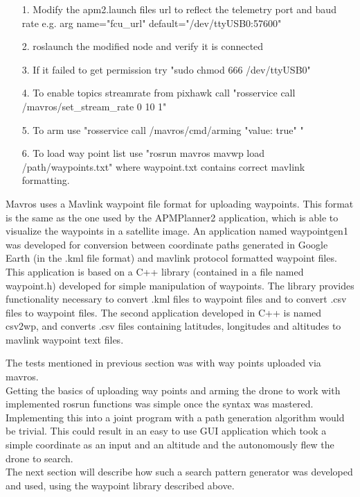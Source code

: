 \begin{itemize}

\item[1.] Modify the apm2.launch files url to reflect the telemetry port and baud rate e.g. arg
name="fcu\_url" default="/dev/ttyUSB0:57600"
\item[2.] roslaunch the modified node and verify it is connected
\item[3.] If it failed to get permission try "sudo chmod 666 /dev/ttyUSB0"
\item[4.] To enable topics streamrate from pixhawk call "rosservice call /mavros/set\_stream\_rate 0
10 1"
\item[5.] To arm use "rosservice call /mavros/cmd/arming "value: true" "
\item[6.] To load way point list use "rosrun mavros mavwp load /path/waypoints.txt" where
waypoint.txt contains correct mavlink formatting.

\end{itemize}

Mavros uses a Mavlink waypoint file format for uploading waypoints.
This format is the same as the one used by the APMPlanner2 application,
which is able to visualize the waypoints in a satellite image.
An application named waypointgen1 was developed for conversion between coordinate paths generated in
Google Earth (in the .kml file format)
and mavlink protocol formatted waypoint files. This application is based on a C++ library (contained
in a file named waypoint.h)
developed for simple manipulation of waypoints. The library provides functionality necessary to
convert .kml files to waypoint files
and to convert .csv files to waypoint files.
The second application developed in C++ is named csv2wp, and converts .csv files containing
latitudes, longitudes and altitudes to mavlink waypoint text files.

The tests mentioned in previous section was with way points uploaded via mavros.\\
Getting the basics of uploading way points and arming the drone to work with implemented rosrun
functions was simple once the syntax was mastered. Implementing this into a joint program with a
path generation algorithm would be trivial. This could result in an easy to use GUI application
which took a simple coordinate as an input and an altitude and the autonomously flew the drone to
search.\\
The next section will describe how such a search pattern generator was developed and used, using the
waypoint library described above.


